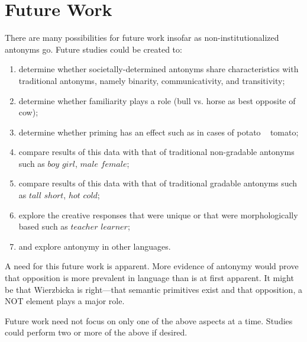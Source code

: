 \section {Future Work}
There are many possibilities for future work insofar as non-institutionalized antonyms go.  Future studies could be created to:
	\begin {enumerate}
		\item determine whether societally-determined antonyms share characteristics with traditional antonyms, namely binarity, communicativity, and transitivity;
		\item determine whether familiarity plays a role (bull vs. horse as best opposite of cow);
		\item determine whether priming has an effect such as in cases of potato ~ tomato;
		\item compare results of this data with that of traditional non-gradable antonyms such as $boy$ \opp $girl$, $male$ \opp $female$;
		\item compare results of this data with that of traditional gradable antonyms such as $tall$ \opp $short$, $hot$ \opp $cold$;
		\item explore the creative responses that were unique or that were morphologically based such as $teacher$ \opp $learner$;
		\item and explore antonymy in other languages.  
	\end {enumerate}
A need for this future work is apparent.  More evidence of antonymy would prove that opposition is more prevalent in language than is at first apparent.  It might be that Wierzbicka is right—that semantic primitives exist and that opposition, a NOT element plays a major role.

Future work need not focus on only one of the above aspects at a time.  Studies could perform two or more of the above if desired.

